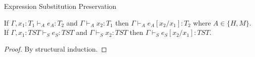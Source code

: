 \begin{lemma}{Expression Substitution Preservation}

\label{lemexp}

If $\Gamma,x_{1}:T_{1}\vdash_{A}e_{A}:T_{2}$ and $\Gamma\vdash_{A}x_{2}:T_{1}$ then $\Gamma\vdash_{A}e_{A}[x_{2}/x_{1}]:T_{2}$ where $A\in\lbrace H,M\rbrace$.  If $\Gamma,x_{1}:TST\vdash_{S}e_{S}:TST$ and $\Gamma\vdash_{S}x_{2}:TST$ then $\Gamma\vdash_{S}e_{S}[x_{2}/x_{1}]:TST$.

\begin{proof}

By structural induction.

\end{proof}

\end{lemma}
